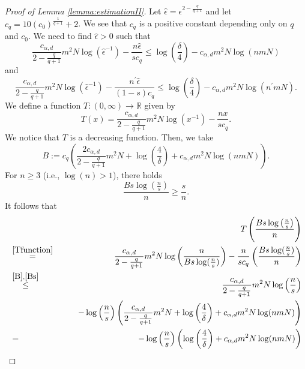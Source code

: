 \documentclass{article}
\def\RR{\mathbb R}
\begin{document}
\begin{proof}[Proof of Lemma \ref{lemma:estimationII}]
Let $\hat \epsilon = \epsilon^{2-{\frac{q}{q+1}}}$ and let $c_q = 10 (c_0)^{\frac{1}{q+1}} +2$. We see that $c_q$ is a positive constant depending only on $q$ and $c_0$. We need to find $\hat \epsilon>0$ such that 
\begin{equation}\label{firstinq}
    \frac{c_{\alpha, d}}{2-{\frac{q}{q+1}}} m^2 N \log (\hat \epsilon^{-1}) - \frac{n\hat \epsilon }{s c_{q}}  \leq \log \left(\frac{\delta}{4}\right) -  c_{\alpha, d} m^2 N \log(nmN)    
\end{equation}
and 
\begin{equation}\label{secondinq}
    \frac{c_{\alpha, d}}{2-{\frac{q}{q+1}}} m^2 N \log (\hat \epsilon^{-1}) - \frac{n^\prime \hat \epsilon }{(1-s) c_{q}}  \leq \log \left(\frac{\delta}{4}\right) -  c_{\alpha, d} m^2 N \log(n^\prime mN).    
\end{equation}
We define a function $T:(0, \infty) \to \RR$ given by 
\begin{equation}\label{Tfunction}
     T(x) = \frac{c_{\alpha, d}}{2-{\frac{q}{q+1}}} m^2 N \log (x^{-1}) - \frac{nx }{sc_{q}}.
\end{equation}     
We notice that $T$ is a decreasing function. Then, we take
\begin{equation}\label{B}
    B:=c_{q} \left(\frac{2c_{\alpha, d}}{2-{\frac{q}{q+1}}} m^2 N + \log \left(\frac{4}{\delta}\right) + c_{\alpha, d} m^2 N\log(nmN)\right).  
\end{equation}
For $n \geq 3$ (i.e., $\log (n) >1$), there holds 
\begin{equation}\label{Bs}
    \frac{B s\log \left(\frac{n}{s}\right)}{n}
 \geq \frac{s}{n}.
\end{equation}
It follows that  
\begin{eqnarray*}
   && T\left( \frac{Bs\log \left(\frac{n}{s}\right)}{n}
\right)\\
   &\stackrel{\eqref{Tfunction}}{=}& \frac{c_{\alpha, d}}{2-{\frac{q}{q+1}}} m^2 N \log \left(\frac{n}{Bs\log (\frac{n}{s})}\right) - \frac{n}{sc_{q}}\left(\frac{Bs\log (\frac{n}{s})}{n}\right)\\
   &\stackrel{\eqref{B}, \eqref{Bs}}{\leq}& \frac{c_{\alpha, d}}{2-{\frac{q}{q+1}}} m^2 N \log \left(\frac{n}{s}\right)\\
   &&\qquad- \log \left(\frac{n}{s}\right)\left(\frac{c_{\alpha, d}}{2-{\frac{q}{q+1}}} m^2 N + \log \left(\frac{4}{\delta}\right) + c_{\alpha, d} m^2 N \log(nmN)\right)\\
   &=&  - \log \left(\frac{n}{s}\right) \left(\log \left(\frac{4}{\delta}\right) + c_{\alpha, d} m^2 N \log(nmN)\right)\\

\end{eqnarray*}
\end{proof}
\end{document}
